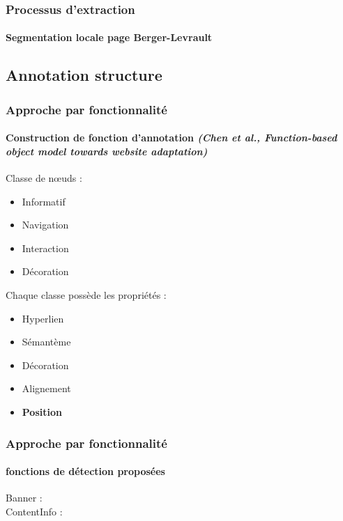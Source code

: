 \documentclass[9pt]{beamer}
\begin{document}
\begin{frame}
	\frametitle{Processus d'extraction}
	\framesubtitle{Segmentation locale page Berger-Levrault}

		\vspace{1cm}

\end{frame}

\subsection{Annotation structure}
\begin{frame}
\frametitle{Approche par fonctionnalité}
\framesubtitle{Construction de fonction d'annotation \textit{(Chen et al., Function-based object model towards website adaptation)}}
\begin{block}{}
Classe de n\oe{}uds :
\begin{itemize}
	\item Informatif
	\item Navigation
	\item Interaction
	\item Décoration
\end{itemize}
Chaque classe possède les propriétés : 
\begin{itemize}
\item Hyperlien
\item Sémantème
\item Décoration
\item Alignement
\item \textbf{Position}
\end{itemize}
\end{block}

\end{frame}

\begin{frame}
\frametitle{Approche par fonctionnalité}
\framesubtitle{fonctions de détection proposées}
\begin{block}{}
	\begin{description}
		\item[Banner :]
		\item[ContentInfo :]
	\end{description}
\end{block}
\end{frame}
\end{document}

